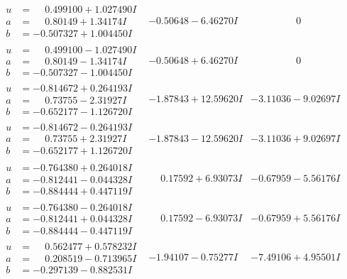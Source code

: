 \documentclass[1p]{elsarticle_modified}
\theoremstyle{definition}
\begin{document}
$$\begin{array}{c|c|c}
\begin{aligned}
u &= \phantom{-}0.499100 + 1.027490 I \\
a &= \phantom{-}0.80149 + 1.34174 I \\
b &= -0.507327 + 1.004450 I\end{aligned}
 & -0.50648 - 6.46270 I & \phantom{-0.000000 } 0 \\ \hline\begin{aligned}
u &= \phantom{-}0.499100 - 1.027490 I \\
a &= \phantom{-}0.80149 - 1.34174 I \\
b &= -0.507327 - 1.004450 I\end{aligned}
 & -0.50648 + 6.46270 I & \phantom{-0.000000 } 0 \\ \hline\begin{aligned}
u &= -0.814672 + 0.264193 I \\
a &= \phantom{-}0.73755 - 2.31927 I \\
b &= -0.652177 - 1.126720 I\end{aligned}
 & -1.87843 + 12.59620 I & -3.11036 - 9.02697 I \\ \hline\begin{aligned}
u &= -0.814672 - 0.264193 I \\
a &= \phantom{-}0.73755 + 2.31927 I \\
b &= -0.652177 + 1.126720 I\end{aligned}
 & -1.87843 - 12.59620 I & -3.11036 + 9.02697 I \\ \hline\begin{aligned}
u &= -0.764380 + 0.264018 I \\
a &= -0.812441 - 0.044328 I \\
b &= -0.884444 + 0.447119 I\end{aligned}
 & \phantom{-}0.17592 + 6.93073 I & -0.67959 - 5.56176 I \\ \hline\begin{aligned}
u &= -0.764380 - 0.264018 I \\
a &= -0.812441 + 0.044328 I \\
b &= -0.884444 - 0.447119 I\end{aligned}
 & \phantom{-}0.17592 - 6.93073 I & -0.67959 + 5.56176 I \\ \hline\begin{aligned}
u &= \phantom{-}0.562477 + 0.578232 I \\
a &= \phantom{-}0.208519 - 0.713965 I \\
b &= -0.297139 - 0.882531 I\end{aligned}
 & -1.94107 - 0.75277 I & -7.49106 + 4.95501 I \\ \hline\begin{aligned}

\end{aligned}
\end{array}$$
\end{document}
